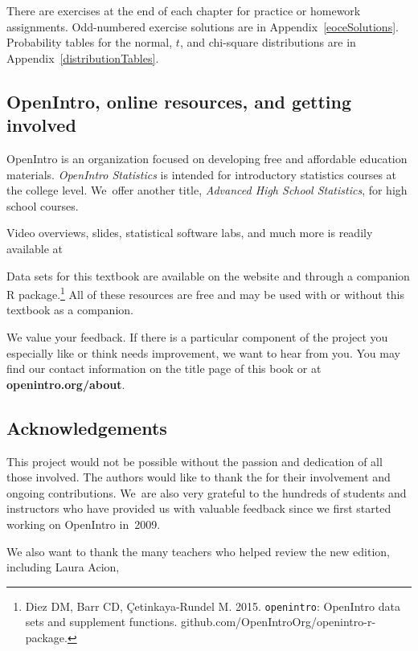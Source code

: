 There are exercises at the end of each chapter for practice
or homework assignments.
Odd-numbered exercise solutions are in
Appendix~\ref{eoceSolutions}.
Probability tables for the normal, $t$,
and chi-square distributions are in
Appendix~\ref{distributionTables}.

\subsection*{OpenIntro, online resources, and getting involved}

OpenIntro is an organization focused on developing
free and affordable education materials.
\emph{OpenIntro Statistics} is intended for introductory
statistics courses at the college level.
We~offer another title,
    {\emph{Advanced High School Statistics}},
for high school courses.

Video overviews, slides, statistical software labs,
and much more is readily available at\\[-4mm]
\begin{center}
\end{center}
Data sets for this textbook are available on the website
and through a companion R package.\footnote{Diez DM,
    Barr CD, \c{C}etinkaya-Rundel M. 2015.
    \texttt{openintro}: OpenIntro data sets and supplement
    functions.
        {github.com/OpenIntroOrg/openintro-r-package}.}
All of these resources are free and may be used with
or without this textbook as a companion.

We value your feedback.
If there is a particular component of the project you
especially like or think needs improvement,
we want to hear from you.
You may find our contact information on the title page
of this book or at
    {\color{black}\textbf{openintro.org/about}}.

\subsection*{Acknowledgements}

This project would not be possible without the passion
and dedication of all those involved.
The authors would like to thank the
for their involvement and ongoing contributions.
We~are also very grateful to the hundreds of students
and instructors who have provided us with valuable feedback
since we first started working on OpenIntro in~2009.

We also want to thank the many teachers who helped review
the new edition, including
Laura Acion,
